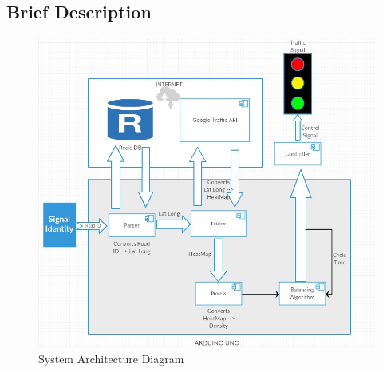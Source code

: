 \documentclass[12pt,a4paper,final]{article}
\begin{document}
\begin{flushleft}
\noindent


\noindent
\pagebreak
\section{Brief Description}
\begin{figure}[H]
\begin{center}
\includegraphics[scale=0.5]{architecture.jpg}
\caption{System Architecture Diagram}
\end{center}
\end{figure}



\end{flushleft}
\end{document}
